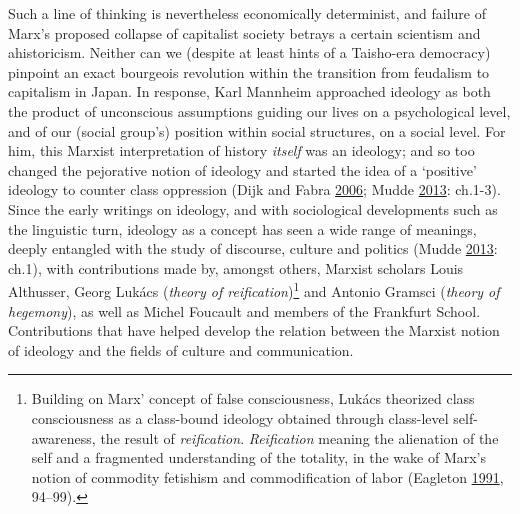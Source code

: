 \documentclass[10pt,british,A4paper,twoside]{memoir}
\begin{document}
Such a line of thinking is nevertheless economically determinist, and
failure of Marx's proposed collapse of capitalist society betrays a
certain scientism and ahistoricism. Neither can we (despite at least
hints of a Taisho-era democracy) pinpoint an exact bourgeois revolution
within the transition from feudalism to capitalism in Japan. In
response, Karl Mannheim approached ideology as both the product of
unconscious assumptions guiding our lives on a psychological level, and
of our (social group's) position within social structures, on a social
level. For him, this Marxist interpretation of history \emph{itself} was
an ideology; and so too changed the pejorative notion of ideology and
started the idea of a `positive' ideology to counter class oppression
(Dijk and Fabra \protect\hyperlink{ref-van_dijk_politics_2006}{2006};
Mudde \protect\hyperlink{ref-mudde_oxford_2013}{2013}: ch.1-3). Since
the early writings on ideology, and with sociological developments such
as the linguistic turn, ideology as a concept has seen a wide range of
meanings, deeply entangled with the study of discourse, culture and
politics (Mudde \protect\hyperlink{ref-mudde_oxford_2013}{2013}: ch.1),
with contributions made by, amongst others, Marxist scholars Louis
Althusser, Georg Lukács (\emph{theory of reification})\footnote{Building
  on Marx' concept of false consciousness, Lukács theorized class
  consciousness as a class-bound ideology obtained through class-level
  self-awareness, the result of \emph{reification}. \emph{Reification}
  meaning the alienation of the self and a fragmented understanding of
  the totality, in the wake of Marx's notion of commodity fetishism and
  commodification of labor (Eagleton
  \protect\hyperlink{ref-eagleton_ideology:_1991}{1991}, 94--99).} and
Antonio Gramsci (\emph{theory of hegemony}), as well as Michel Foucault
and members of the Frankfurt School. Contributions that have helped
develop the relation between the Marxist notion of ideology and the
fields of culture and communication.
\end{document}
